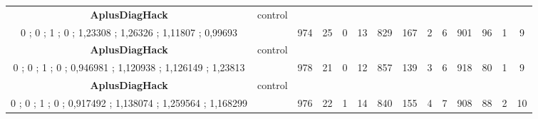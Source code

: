 \begin{table}[]
{\begin{tabular}{|c|c|c|c|c|c|c|c|c|c|c|c|c|c|}
\cellcolor{blue!15}\textbf{AplusDiagHack} & control& {\color[HTML]{00009B} } & {\color[HTML]{9A0000} } & {\color[HTML]{009901} } &  & {\color[HTML]{00009B} } & {\color[HTML]{9A0000} } & {\color[HTML]{009901} } &  & {\color[HTML]{00009B} } & {\color[HTML]{9A0000} } & {\color[HTML]{009901} } &  \\ 
\cellcolor{ blue!15}0 ; 0 ; 1 ; 0 ; 1,23308 ; 1,26326 ; 1,11807 ; 0,99693 &  & \multirow{-2}{*}{{\color[HTML]{00009B} 974}} & \multirow{-2}{*}{{\color[HTML]{9A0000} 25}} & \multirow{-2}{*}{{\color[HTML]{009901} 0}} & \multirow{-2}{*}{13} & \multirow{-2}{*}{{\color[HTML]{00009B} 829}} & \multirow{-2}{*}{{\color[HTML]{9A0000} 167}} & \multirow{-2}{*}{{\color[HTML]{009901} 2}} & \multirow{-2}{*}{6} & \multirow{-2}{*}{{\color[HTML]{00009B} 901}} & \multirow{-2}{*}{{\color[HTML]{9A0000} 96}} & \multirow{-2}{*}{{\color[HTML]{009901} 1}} & \multirow{-2}{*}{9} \\ \hline

\cellcolor{blue!15}\textbf{AplusDiagHack} & control& {\color[HTML]{00009B} } & {\color[HTML]{9A0000} } & {\color[HTML]{009901} } &  & {\color[HTML]{00009B} } & {\color[HTML]{9A0000} } & {\color[HTML]{009901} } &  & {\color[HTML]{00009B} } & {\color[HTML]{9A0000} } & {\color[HTML]{009901} } &  \\ 
\cellcolor{ blue!15}0 ; 0 ; 1 ; 0 ; 0,946981 ; 1,120938 ; 1,126149 ; 1,23813 &  & \multirow{-2}{*}{{\color[HTML]{00009B} 978}} & \multirow{-2}{*}{{\color[HTML]{9A0000} 21}} & \multirow{-2}{*}{{\color[HTML]{009901} 0}} & \multirow{-2}{*}{12} & \multirow{-2}{*}{{\color[HTML]{00009B} 857}} & \multirow{-2}{*}{{\color[HTML]{9A0000} 139}} & \multirow{-2}{*}{{\color[HTML]{009901} 3}} & \multirow{-2}{*}{6} & \multirow{-2}{*}{{\color[HTML]{00009B} 918}} & \multirow{-2}{*}{{\color[HTML]{9A0000} 80}} & \multirow{-2}{*}{{\color[HTML]{009901} 1}} & \multirow{-2}{*}{9} \\ \hline

\cellcolor{blue!15}\textbf{AplusDiagHack} & control& {\color[HTML]{00009B} } & {\color[HTML]{9A0000} } & {\color[HTML]{009901} } &  & {\color[HTML]{00009B} } & {\color[HTML]{9A0000} } & {\color[HTML]{009901} } &  & {\color[HTML]{00009B} } & {\color[HTML]{9A0000} } & {\color[HTML]{009901} } &  \\ 
\cellcolor{ blue!15}0 ; 0 ; 1 ; 0 ; 0,917492 ; 1,138074 ; 1,259564 ; 1,168299 &  & \multirow{-2}{*}{{\color[HTML]{00009B} 976}} & \multirow{-2}{*}{{\color[HTML]{9A0000} 22}} & \multirow{-2}{*}{{\color[HTML]{009901} 1}} & \multirow{-2}{*}{14} & \multirow{-2}{*}{{\color[HTML]{00009B} 840}} & \multirow{-2}{*}{{\color[HTML]{9A0000} 155}} & \multirow{-2}{*}{{\color[HTML]{009901} 4}} & \multirow{-2}{*}{7} & \multirow{-2}{*}{{\color[HTML]{00009B} 908}} & \multirow{-2}{*}{{\color[HTML]{9A0000} 88}} & \multirow{-2}{*}{{\color[HTML]{009901} 2}} & \multirow{-2}{*}{10} \\ \hline


\end{tabular}}
\end{table}
